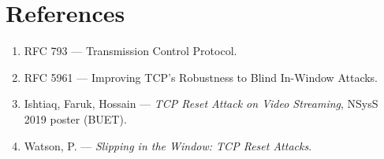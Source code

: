 \documentclass[11pt]{article}
\begin{document}
\section*{References}
\begin{enumerate}[leftmargin=1.5em]
\item RFC 793 --- Transmission Control Protocol.
\item RFC 5961 --- Improving TCP's Robustness to Blind In-Window Attacks.
\item Ishtiaq, Faruk, Hossain --- \emph{TCP Reset Attack on Video Streaming}, NSysS 2019 poster (BUET).
\item Watson, P. --- \emph{Slipping in the Window: TCP Reset Attacks}.
\end{enumerate}
\end{document}
